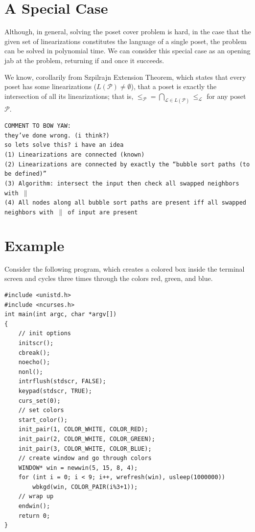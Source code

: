 \documentclass[12pt]{llncs}
\let\oldleq\leq
\renewcommand{\leq}[1][]{\oldleq_{#1}}
\newcommand{\comment}[1]{\texttt{COMMENT TO BOW YAW:\\#1}}
\newcommand{\poset}[1]{\mathcal{#1}}
\newcommand{\lang}[1]{L(#1)}
\newcommand{\incomp}{\parallel}
\begin{document}
\section{A Special Case}
Although, in general, solving the poset cover problem is hard, in the case that the given set of linearizations constitutes the language of a single poset, the problem can be solved in polynomial time. We can consider this special case as an opening jab at the problem, returning if and once it succeeds.

We know, corollarily from Szpilrajn Extension Theorem, which states that every poset has some linearizations ($\lang{\poset{P}} \neq \emptyset$), that a poset is exactly the intersection of all its linearizations; that is, $\leq[\poset{P}] = \bigcap_{\poset{L} \in \lang{\poset{P}}} \leq[\poset{L}]$ for any poset $\poset{P}$.

\comment{they've done wrong. (i think?)\\so lets solve this? i have an idea\\(1) Linearizations are connected (known)\\(2) Linearizations are connected by exactly the ``bubble sort paths (to be defined)''\\(3) Algorithm: intersect the input then check all swapped neighbors with $\incomp$\\(4) All nodes along all bubble sort paths are present iff all swapped neighbors with $\incomp$ of input are present}

\section{Example}
Consider the following program, which creates a colored box inside the terminal screen and cycles three times through the colors red, green, and blue.

\begin{verbatim}
#include <unistd.h>
#include <ncurses.h>
int main(int argc, char *argv[])
{
    // init options
    initscr();
    cbreak();
    noecho();
    nonl();
    intrflush(stdscr, FALSE);
    keypad(stdscr, TRUE);
    curs_set(0);
    // set colors
    start_color();
    init_pair(1, COLOR_WHITE, COLOR_RED);
    init_pair(2, COLOR_WHITE, COLOR_GREEN);
    init_pair(3, COLOR_WHITE, COLOR_BLUE);
    // create window and go through colors
    WINDOW* win = newwin(5, 15, 8, 4);
    for (int i = 0; i < 9; i++, wrefresh(win), usleep(1000000))
        wbkgd(win, COLOR_PAIR(i%3+1));
    // wrap up
    endwin();
    return 0;
}
\end{verbatim}
\end{document}

